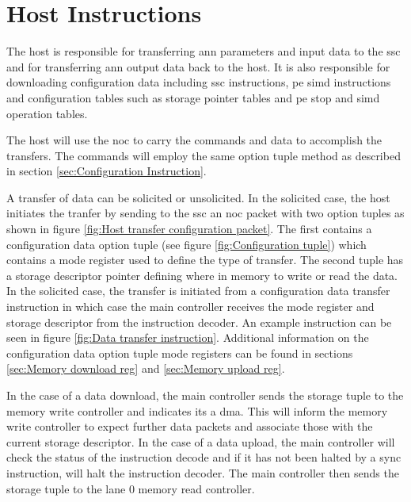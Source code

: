 \section{Host Instructions}
\label{sec:Host Instructions}

The host is responsible for transferring \ac{ann} parameters and input data to the \ac{ssc} and for transferring \ac{ann} output data back to the host.
It is also responsible for downloading configuration data including \ac{ssc} instructions, \ac{pe} \ac{simd} instructions and configuration tables such as storage pointer tables and \ac{pe} \ac{stop} and \ac{simd} operation tables.

The host will use the \ac{noc} to carry the commands and data to accomplish the transfers.
The commands will employ the same option tuple method as described in section \ref{sec:Configuration Instruction}.

A transfer of data can be solicited or unsolicited.
In the solicited case, the host initiates the tranfer by sending to the \ac{ssc} an \ac{noc} packet with two option tuples as shown in figure \ref{fig:Host transfer configuration packet}.
The first contains a configuration data option tuple (see figure \ref{fig:Configuration tuple}) which contains a mode register used to define the type of transfer.
The second tuple has a storage descriptor pointer defining where in memory to write or read the data.
In the solicited case, the transfer is initiated from a configuration data transfer instruction in which case the main controller receives the mode register and storage descriptor from the instruction decoder.
An example instruction can be seen in figure \ref{fig:Data transfer instruction}.
Additional information on the configuration data option tuple mode registers can be found in sections \ref{sec:Memory download reg} and \ref{sec:Memory upload reg}.

In the case of a data download, the main controller sends the storage tuple to the memory write controller and indicates its a \ac{dma}.
This will inform the memory write controller to expect further data packets and associate those with the current storage descriptor.
In the case of a data upload, the main controller will check the status of the instruction decode and if it has not been halted by a sync instruction, will halt the instruction decoder.
The main controller then sends the storage tuple to the lane 0 memory read controller.

